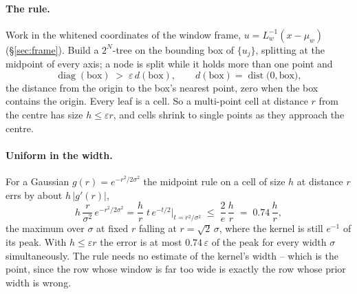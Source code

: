\documentclass[11pt]{article}
\newcommand{\eps}{\varepsilon}
\begin{document}
\paragraph{The rule.} Work in the whitened coordinates of the window frame,
$u = L_w^{-1}(x - \mu_w)$ (\S\ref{sec:frame}). Build a $2^N$-tree on the
bounding box of $\{u_j\}$, splitting at the midpoint of every axis; a node is
split while it holds more than one point and
\begin{equation}
\operatorname{diag}(\text{box}) \;>\; \eps\, d(\text{box}), \qquad
d(\text{box}) = \operatorname{dist}\big(0, \text{box}\big),
\label{eq:grading}
\end{equation}
the distance from the origin to the box's nearest point, zero when the box
contains the origin. Every leaf is a cell. So a multi-point cell at distance
$r$ from the centre has size $h \le \eps r$, and cells shrink to single
points as they approach the centre.

\paragraph{Uniform in the width.} For a Gaussian $g(r) = e^{-r^2/2\sigma^2}$
the midpoint rule on a cell of size $h$ at distance $r$ errs by about
$h\,|g'(r)|$,
\begin{equation}
h\,\frac{r}{\sigma^2}\, e^{-r^2/2\sigma^2}
 = \frac{h}{r}\; t\, e^{-t/2}\Big|_{t = r^2/\sigma^2}
 \;\le\; \frac{2}{e}\,\frac{h}{r} \;=\; 0.74\,\frac{h}{r},
\label{eq:gauss-bound}
\end{equation}
the maximum over $\sigma$ at fixed $r$ falling at $r = \sqrt 2\,\sigma$, where
the kernel is still $e^{-1}$ of its peak. With $h \le \eps r$ the error is at
most $0.74\,\eps$ of the peak for every width $\sigma$ simultaneously. The
rule needs no estimate of the kernel's width -- which is the point, since the
row whose window is far too wide is exactly the row whose prior width is
wrong.
\end{document}
